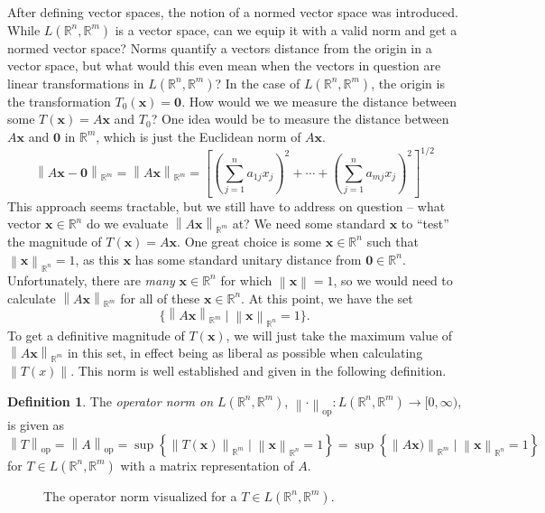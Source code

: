 \documentclass{article}
\newcommand{\R}{\mathbb{R}}
\newcommand{\x}{\mathbf{x}}
\newcommand{\ze}{\mathbf{0}}
\newcommand{\norm}[1]{\left\lVert#1\right\rVert}
\theoremstyle{definition}
\newtheorem{definition}{Definition}[section]
\begin{document}
	After defining vector spaces, the notion of a normed vector space was introduced. While $ L(\R^n,\R^m) $ is a vector space, can we equip it with a valid norm and get a normed vector space? Norms quantify a vectors distance from the origin in a vector space, but what would this even mean when the vectors in question are linear transformations in $ L(\R^n, \R^m) $? In the case of $ L(\R^n,\R^m) $, the origin is the transformation $ T_0(\x)=\ze $. How would we we measure the distance between some $ T(\x)=A\x $ and $ T_0 $? One idea would be to measure the distance between $ A\x $ and $ \ze $ in $ \R^m $, which is just the Euclidean norm of $ A\x $.
	$$ \norm{A\x - \ze }_{\R^m}= \norm{A\x}_{\R^m} = \left[\left(\sum_{j=1}^{n}a_{1j}x_j\right)^2 + \cdots + \left(\sum_{j=1}^{n}a_{mj}x_j \right)^2\right]^{1/2}$$
	This approach seems tractable, but we still have to address on question -- what vector $ \x\in\R^n $ do we evaluate $ \norm{A\x}_{\R^m} $ at? We need some standard $ \x $ to ``test'' the magnitude of $ T(\x)=A\x $. One great choice is some $ \x\in\R^n $ such that $ \norm{\x}_{\R^n} = 1 $, as this $ \x $ has some standard unitary distance from $ \ze \in \R^n $. Unfortunately, there are \textit{many} $ \x\in\R^n $ for which $ \norm{\x}=1 $, so we would need to calculate $ \norm{A\x}_{\R^m} $ for all of these $ \x\in\R^n $. At this point, we have the set $$ \{\norm{A\x}_{\R^m}\mid \norm{\x}_{\R^n} = 1\} .$$ To get a definitive magnitude of $ T(\x) $, we will just take the maximum value of $ \norm{A\x}_{\R^m} $ in this set, in effect being as liberal as possible when calculating $ \norm{T(x)} $. This norm is well established and given in the following definition.  
	\begin{definition}
		The \textit{\color{red}operator norm on $ L(\R^n,\R^m) $}, $ \norm{\cdot}_\text{op}:L(\R^n,\R^m)\to [0,\infty) $, is given as 
		$$ \norm{T}_\text{op} = \norm{A}_\text{op}= \sup\left\{\norm{T(\x)}_{\R^m}\mid \norm{\x}_{\R^n} = 1\right\} = \sup\left\{\norm{A\x)}_{\R^m}\mid \norm{\x}_{\R^n} = 1\right\}$$
		for $ T\in L(\R^n,\R^m) $ with a matrix representation of $ A $. 
	\end{definition}
	\begin{figure}[h!]
		\centering
		\caption{The operator norm visualized for a $ T\in L(\R^n,\R^m) $.}
	\end{figure}
	
\end{document}
